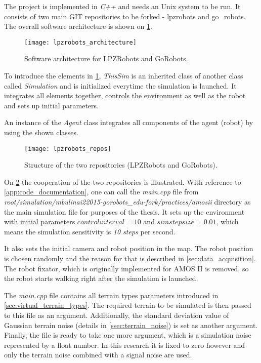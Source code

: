The project is implemented in \textit{C++} and needs an Unix system to be run. It consists of two main GIT repositories to be forked - lpzrobots and go\_robots. The overall software architecture is shown on \cref{img:lpzrobots_architecture}.

\begin{figure}[H]
  \centering
  \texttt{[image: lpzrobots\_architecture]}
  \caption{Software architecture for LPZRobots and GoRobots. \citep{misc:lpzrobots}}
  \label{img:lpzrobots_architecture}
\end{figure}

To introduce the elements in \cref{img:lpzrobots_architecture}, \textit{ThisSim} is an inherited class of another class called \textit{Simulation} and is initialized everytime the simulation is launched. It integrates all elements together, controls the environment as well as the robot and sets up initial parameters.

An instance of the \textit{Agent} class integrates all components of the agent (robot) by using the shown classes.

\begin{figure}[H]
  \centering
  \texttt{[image: lpzrobots\_repos]}
  \caption{Structure of the two repositories (LPZRobots and GoRobots). \citep{misc:lpzrobots}}
  \label{img:lpzrobots_repos}
\end{figure}

On \cref{img:lpzrobots_repos} the cooperation of the two repositories is illustrated. With reference to \cref{app:code_documentation}, one can call the \textit{main.cpp} file from \textit{root/simulation/mbulinai22015-gorobots\_edu-fork/practices/amosii} directory as the main simulation file for purposes of the thesis. It sets up the environment with initial parameters $ controlinterval = 10 $ and $ simstepsize = 0.01 $, which means the simulation sensitivity is \textit{10 steps} per second.

It also sets the initial camera and robot position in the map. The robot position is chosen randomly and the reason for that is described in \cref{sec:data_acquisition}. The robot fixator, which is originally implemented for AMOS II is removed, so the robot starts walking right after the simulation is launched.

The \textit{main.cpp} file contains all terrain types parameters introduced in \cref{sec:virtual_terrain_types}. The required terrain to be simulated is then passed to this file as an argument. Additionally, the standard deviation value of Gaussian terrain noise (details in \cref{ssec:terrain_noise}) is set as another argument. Finally, the file is ready to take one more argument, which is a simulation noise represented by a float number. In this research it is fixed to zero however and only the terrain noise combined with a signal noise are used.

